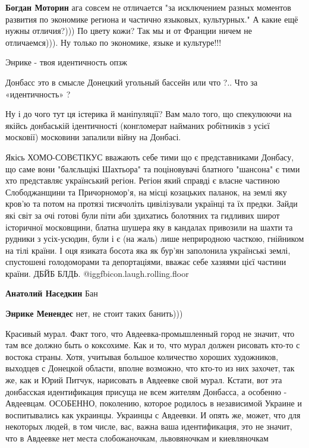 \begin{itemize}
\begin{itemize} %
\textbf{Богдан Моторин} ага совсем не отличается "за исключением разных моментов развития по экономике региона и частично языковых, культурных." А какие ещё нужны отличия?))) По цвету кожи? Так мы и от Франции ничем не отличаемся))). Ну только по экономике, языке и культуре!!!
\end{itemize} %

Энрике - твоя идентичность опзж

Донбасс это в смысле Донецкий угольный бассейн или что ?.. Что за «идентичность» ?


Ну і до чого тут ця істерика й маніпуляції? Вам мало того, що спекулюючи на
якійсь донбаській ідентичності (конгломерат найманих робітників з усієї
московії) московини запалили війну на Донбасі.



Якісь ХОМО-СОВЄТІКУС вважають себе тими що є представниками Донбасу, що саме
вони "балєльщікі Шахтьора" та поціновувачі блатного "шансона" є тими хто
представляє український регіон. Регіон який справді є власне частиною
Слободжанщини та Причорномор'я, на місці козацьких паланок, на землі яку кров'ю
та потом на протязі тисячоліть цивілізували українці та їх предки. Зайди які
світ за очі готові були піти аби здихатись болотяних та гидливих широт
історичної московщини, блатна шушера яку в кандалах привозили на шахти та
рудники з усіх-усюдин, були і є (на жаль) лише неприродною часткою, гнійником
на тілі країни. І оця язиката босота яка як бур'ян заполонила українські землі,
спустошені голодоморами та депортаціями, вважає себе хазяями цієї частини
країни. ДБЙБ БЛДЬ. @igg{fbicon.laugh.rolling.floor} 

\begin{itemize} %
\textbf{Анатолий Наседкин} Бан

\textbf{Энрике Менендес} нет, не стоит таких банить)))
\end{itemize} %


Красивый мурал. Факт того, что Авдеевка-промышленный город не значит, что там
все должно быть о коксохиме. Как и то, что мурал должен рисовать кто-то с
востока страны. Хотя, учитывая большое количество хороших художников, выходцев
с Донецкой области, вполне возможно, что кто-то из них захочет, так же, как и
Юрий Питчук, нарисовать в Авдеевке свой мурал. Кстати, вот эта донбасская
идентификация присуща не всем жителям Донбасса, а особенно - Авдеевцам.
ОСОБЕННО, поколению, которое родилось в независимой Украине и воспитывались как
украинцы. Украинцы с Авдеевки. И опять же, может, что для некоторых людей, в
том числе, вас, важна ваша идентификация, это не значит, что в Авдеевке нет
места слобожаночкам, львовяночкам и киевляночкам



\end{itemize}
